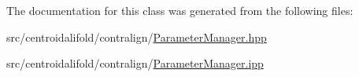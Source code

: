 The documentation for this class was generated from the following files\+:\begin{DoxyCompactItemize}
\item 
src/centroidalifold/contralign/\hyperlink{centroidalifold_2contralign_2_parameter_manager_8hpp}{Parameter\+Manager.\+hpp}\item 
src/centroidalifold/contralign/\hyperlink{centroidalifold_2contralign_2_parameter_manager_8ipp}{Parameter\+Manager.\+ipp}\end{DoxyCompactItemize}
